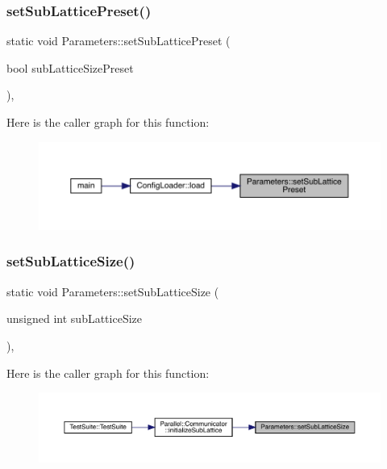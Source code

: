 \subsubsection{\texorpdfstring{setSubLatticePreset()}{setSubLatticePreset()}}
{\footnotesize\ttfamily static void Parameters\+::set\+Sub\+Lattice\+Preset (\begin{DoxyParamCaption}\item[{bool}]{sub\+Lattice\+Size\+Preset }\end{DoxyParamCaption})\hspace{0.3cm}{\ttfamily [inline]}, {\ttfamily [static]}}

Here is the caller graph for this function\+:\nopagebreak
\begin{figure}[H]
\begin{center}
\leavevmode
\includegraphics[width=350pt]{class_parameters_a95d3c7f35ed0421419d98faecb2c23e8_icgraph}
\end{center}
\end{figure}
\mbox{\label{class_parameters_a978f5547036311816f21e3ebe8af77fc}} 
\subsubsection{\texorpdfstring{setSubLatticeSize()}{setSubLatticeSize()}}
{\footnotesize\ttfamily static void Parameters\+::set\+Sub\+Lattice\+Size (\begin{DoxyParamCaption}\item[{unsigned int}]{sub\+Lattice\+Size }\end{DoxyParamCaption})\hspace{0.3cm}{\ttfamily [inline]}, {\ttfamily [static]}}

Here is the caller graph for this function\+:\nopagebreak
\begin{figure}[H]
\begin{center}
\leavevmode
\includegraphics[width=350pt]{class_parameters_a978f5547036311816f21e3ebe8af77fc_icgraph}
\end{center}
\end{figure}
\mbox{\label{class_parameters_a68fb3eccef5dae481915be728ef61fb6}} 
